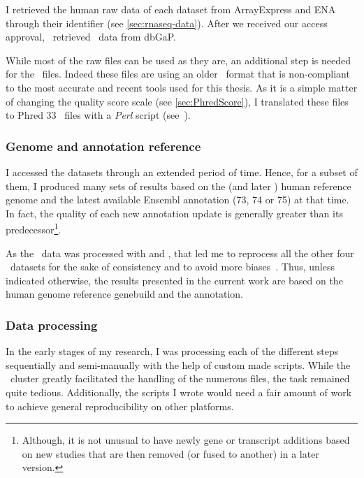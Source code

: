 I retrieved the human raw data of each dataset from \gls{ArrayExpress} and
\gls{ENA} through their identifier (see \cref{sec:rnaseq-data}). After we
received our access approval, \nuno\ retrieved \Gtex\ data from
\gls{dbGaP}.

While most of the raw files can be used as they are, an additional step is
needed for the \castle\ files. Indeed these files are using an older
\fastq\ format that is non-compliant to the most accurate and recent tools used
for this thesis.
As it is a simple matter of changing the quality score scale
(see \cref{sec:PhredScore}),
I translated these files to \gls{Phred} $33$ \fastq\ files with a
\emph{\gls{Perl}} script (see~).

\subsubsection{Genome and annotation reference}

I accessed the datasets through an extended period of time. Hence, for a subset of
them, I produced many sets of results based on the 
(and later ) human reference genome and the latest available
\gls{Ensembl} annotation (73, 74 or 75) at that time.
In fact, the quality of each new annotation update is
generally greater than its predecessor\footnote{Although,
it is not unusual to have newly gene or transcript additions based on new studies
that are then removed (or fused to another) in a later version.
}.
\begin{comment}
    \TK{Ajouter example}
\end{comment}

As the \gtex\ data was processed with  and , that led me
to reprocess all the other four \Rnaseq\ datasets for the sake of consistency and
to avoid more biases~. Thus, unless indicated
otherwise, the results presented in the current work are
based on the  human genome reference genebuild and the 
annotation.


\subsubsection{Data processing}

In the early stages of my research, I was processing each of the different steps
sequentially and semi-manually with the help of custom made scripts. While the
\EBI\ \gls{cluster} greatly facilitated the handling of the numerous files,
the task remained quite tedious.
Additionally,
the scripts I wrote would need a fair amount of work to achieve general
reproducibility on other platforms.


